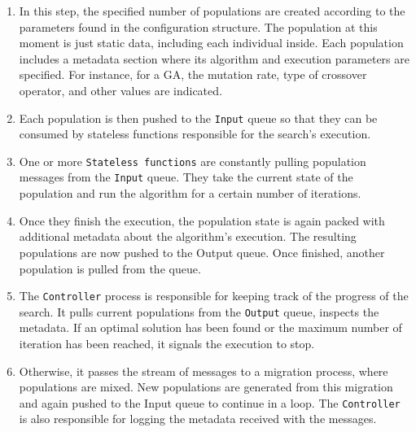 \documentclass[review]{elsarticle}
\begin{document}
\begin{enumerate}
\item In this step, the specified number of populations are created according to the 
parameters found in the configuration structure. The population at this moment is just
static data, including each individual inside. Each population includes a metadata
section where its algorithm and execution parameters are specified. For instance, 
for a GA, the mutation rate, type of crossover operator, and other values are indicated.

\item Each population is then pushed to the \texttt{Input} queue so that they can be consumed 
by stateless functions responsible for the search's execution.

\item One or more \texttt{Stateless functions} are constantly pulling population messages
from the \texttt{Input} queue. They take the current state of the population and 
run the algorithm for a certain number of iterations. 

\item Once they finish the execution, the population state
is again packed with additional metadata about the algorithm's execution.
The resulting populations are now pushed to the Output queue. Once finished, another 
population is pulled from the queue.

\item The \texttt{Controller} process is responsible for keeping track of the progress of 
the search. It pulls current populations from the \texttt{Output} queue, inspects the metadata. 
If an optimal solution has been found or the maximum number of iteration has been
reached, it signals the execution to stop. 

\item Otherwise, it passes the stream of messages 
to a migration process, where populations are mixed. New populations 
are generated from this migration and again pushed to the Input queue to continue 
in a loop. The \texttt{Controller} is also responsible for logging the metadata received with the
messages.  
\end{enumerate}
\end{document}
